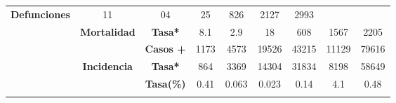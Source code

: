 \begin{tabular}{ccc|cccccc|}
		\multirow{-2}{*}{\cellcolor[HTML]{FFFFC7}\textbf{Defunciones}} &
		\multicolumn{1}{c|}{\multirow{-2}{*}{\cellcolor[HTML]{FFFFC7}11}} &
		\multicolumn{1}{c|}{\multirow{-2}{*}{\cellcolor[HTML]{FFFFC7}04}} &
		\multicolumn{1}{c|}{\multirow{-2}{*}{\cellcolor[HTML]{FFFFC7}25}} &
		\multicolumn{1}{c|}{\multirow{-2}{*}{\cellcolor[HTML]{FFFFC7}826}} &
		\multicolumn{1}{c|}{\multirow{-2}{*}{\cellcolor[HTML]{FFFFC7}2127}} &
		\multirow{-2}{*}{\cellcolor[HTML]{FFFFC7}2993} \\ \cline{3-9} 
		\rowcolor[HTML]{FFFFC7} 
		\multicolumn{1}{|c|}{\cellcolor[HTML]{FFFFC7}} &
		\multicolumn{1}{c|}{\multirow{-2}{*}{\cellcolor[HTML]{FFFFC7}\textbf{Mortalidad}}} &
		\textbf{Tasa*} &
		\multicolumn{1}{c|}{\cellcolor[HTML]{FFFFC7}8.1} &
		\multicolumn{1}{c|}{\cellcolor[HTML]{FFFFC7}2.9} &
		\multicolumn{1}{c|}{\cellcolor[HTML]{FFFFC7}18} &
		\multicolumn{1}{c|}{\cellcolor[HTML]{FFFFC7}608} &
		\multicolumn{1}{c|}{\cellcolor[HTML]{FFFFC7}1567} &
		2205 \\ \cline{2-9} 
		\rowcolor[HTML]{FFFFC7} 
		\multicolumn{1}{|c|}{\cellcolor[HTML]{FFFFC7}} &
		\multicolumn{1}{c|}{\cellcolor[HTML]{FFFFC7}} &
		\textbf{Casos +} &
		\multicolumn{1}{c|}{\cellcolor[HTML]{FFFFC7}1173} &
		\multicolumn{1}{c|}{\cellcolor[HTML]{FFFFC7}4573} &
		\multicolumn{1}{c|}{\cellcolor[HTML]{FFFFC7}19526} &
		\multicolumn{1}{c|}{\cellcolor[HTML]{FFFFC7}43215} &
		\multicolumn{1}{c|}{\cellcolor[HTML]{FFFFC7}11129} &
		79616 \\ \cline{3-9} 
		\rowcolor[HTML]{FFFFC7} 
		\multicolumn{1}{|c|}{\multirow{-6}{*}{\cellcolor[HTML]{FFFFC7}\textbf{2021}}} &
		\multicolumn{1}{c|}{\multirow{-2}{*}{\cellcolor[HTML]{FFFFC7}\textbf{Incidencia}}} &
		\textbf{Tasa*} &
		\multicolumn{1}{c|}{\cellcolor[HTML]{FFFFC7}864} &
		\multicolumn{1}{c|}{\cellcolor[HTML]{FFFFC7}3369} &
		\multicolumn{1}{c|}{\cellcolor[HTML]{FFFFC7}14304} &
		\multicolumn{1}{c|}{\cellcolor[HTML]{FFFFC7}31834} &
		\multicolumn{1}{c|}{\cellcolor[HTML]{FFFFC7}8198} &
		58649 \\ \hline
		\rowcolor[HTML]{E2EFDA} 
		\multicolumn{1}{|c|}{\cellcolor[HTML]{E2EFDA}} &
		\multicolumn{1}{c|}{\cellcolor[HTML]{E2EFDA}} &
		\textbf{Tasa(\%)} 
		&\multicolumn{1}{c|}{\cellcolor[HTML]{E2EFDA}0.41} 
		&\multicolumn{1}{c|}{\cellcolor[HTML]{E2EFDA}0.063} 
		&\multicolumn{1}{c|}{\cellcolor[HTML]{E2EFDA}0.023} 
		&\multicolumn{1}{c|}{\cellcolor[HTML]{E2EFDA}0.14} 
		&\multicolumn{1}{c|}{\cellcolor[HTML]{E2EFDA}4.1} 
		&0.48 \\ \cline{3-9} 
		\rowcolor[HTML]{E2EFDA} 
		\multicolumn{1}{|c|}{\cellcolor[HTML]{E2EFDA}} 

\end{tabular}
